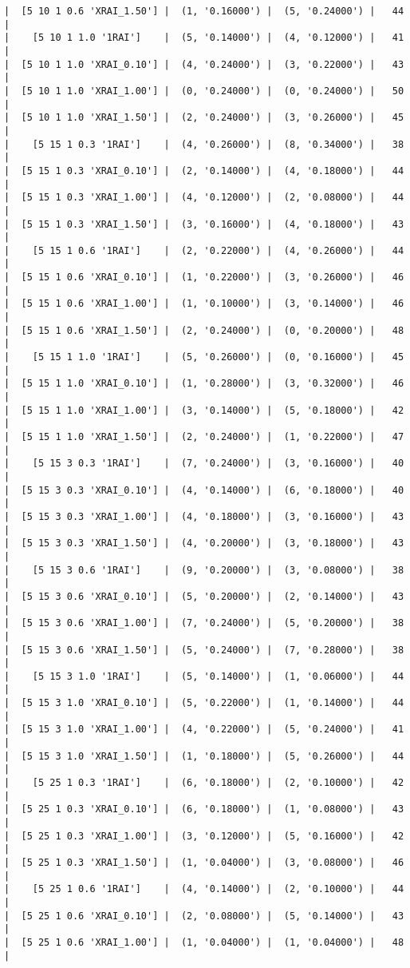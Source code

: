 \documentclass{article}
\begin{document}
\begin{verbatim}
|  [5 10 1 0.6 'XRAI_1.50'] |  (1, '0.16000') |  (5, '0.24000') |   44  |
|    [5 10 1 1.0 '1RAI']    |  (5, '0.14000') |  (4, '0.12000') |   41  |
|  [5 10 1 1.0 'XRAI_0.10'] |  (4, '0.24000') |  (3, '0.22000') |   43  |
|  [5 10 1 1.0 'XRAI_1.00'] |  (0, '0.24000') |  (0, '0.24000') |   50  |
|  [5 10 1 1.0 'XRAI_1.50'] |  (2, '0.24000') |  (3, '0.26000') |   45  |
|    [5 15 1 0.3 '1RAI']    |  (4, '0.26000') |  (8, '0.34000') |   38  |
|  [5 15 1 0.3 'XRAI_0.10'] |  (2, '0.14000') |  (4, '0.18000') |   44  |
|  [5 15 1 0.3 'XRAI_1.00'] |  (4, '0.12000') |  (2, '0.08000') |   44  |
|  [5 15 1 0.3 'XRAI_1.50'] |  (3, '0.16000') |  (4, '0.18000') |   43  |
|    [5 15 1 0.6 '1RAI']    |  (2, '0.22000') |  (4, '0.26000') |   44  |
|  [5 15 1 0.6 'XRAI_0.10'] |  (1, '0.22000') |  (3, '0.26000') |   46  |
|  [5 15 1 0.6 'XRAI_1.00'] |  (1, '0.10000') |  (3, '0.14000') |   46  |
|  [5 15 1 0.6 'XRAI_1.50'] |  (2, '0.24000') |  (0, '0.20000') |   48  |
|    [5 15 1 1.0 '1RAI']    |  (5, '0.26000') |  (0, '0.16000') |   45  |
|  [5 15 1 1.0 'XRAI_0.10'] |  (1, '0.28000') |  (3, '0.32000') |   46  |
|  [5 15 1 1.0 'XRAI_1.00'] |  (3, '0.14000') |  (5, '0.18000') |   42  |
|  [5 15 1 1.0 'XRAI_1.50'] |  (2, '0.24000') |  (1, '0.22000') |   47  |
|    [5 15 3 0.3 '1RAI']    |  (7, '0.24000') |  (3, '0.16000') |   40  |
|  [5 15 3 0.3 'XRAI_0.10'] |  (4, '0.14000') |  (6, '0.18000') |   40  |
|  [5 15 3 0.3 'XRAI_1.00'] |  (4, '0.18000') |  (3, '0.16000') |   43  |
|  [5 15 3 0.3 'XRAI_1.50'] |  (4, '0.20000') |  (3, '0.18000') |   43  |
|    [5 15 3 0.6 '1RAI']    |  (9, '0.20000') |  (3, '0.08000') |   38  |
|  [5 15 3 0.6 'XRAI_0.10'] |  (5, '0.20000') |  (2, '0.14000') |   43  |
|  [5 15 3 0.6 'XRAI_1.00'] |  (7, '0.24000') |  (5, '0.20000') |   38  |
|  [5 15 3 0.6 'XRAI_1.50'] |  (5, '0.24000') |  (7, '0.28000') |   38  |
|    [5 15 3 1.0 '1RAI']    |  (5, '0.14000') |  (1, '0.06000') |   44  |
|  [5 15 3 1.0 'XRAI_0.10'] |  (5, '0.22000') |  (1, '0.14000') |   44  |
|  [5 15 3 1.0 'XRAI_1.00'] |  (4, '0.22000') |  (5, '0.24000') |   41  |
|  [5 15 3 1.0 'XRAI_1.50'] |  (1, '0.18000') |  (5, '0.26000') |   44  |
|    [5 25 1 0.3 '1RAI']    |  (6, '0.18000') |  (2, '0.10000') |   42  |
|  [5 25 1 0.3 'XRAI_0.10'] |  (6, '0.18000') |  (1, '0.08000') |   43  |
|  [5 25 1 0.3 'XRAI_1.00'] |  (3, '0.12000') |  (5, '0.16000') |   42  |
|  [5 25 1 0.3 'XRAI_1.50'] |  (1, '0.04000') |  (3, '0.08000') |   46  |
|    [5 25 1 0.6 '1RAI']    |  (4, '0.14000') |  (2, '0.10000') |   44  |
|  [5 25 1 0.6 'XRAI_0.10'] |  (2, '0.08000') |  (5, '0.14000') |   43  |
|  [5 25 1 0.6 'XRAI_1.00'] |  (1, '0.04000') |  (1, '0.04000') |   48  |

\end{verbatim}
\end{document}
